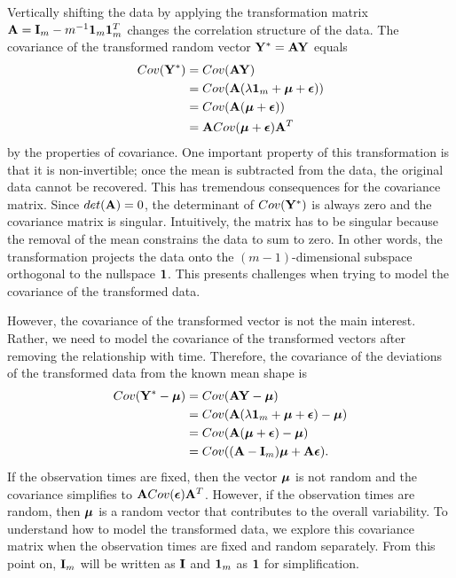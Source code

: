 Vertically shifting the data by applying the transformation matrix $\mathbf A = \mathbf I_{m}-m^{-1}\mathbf 1_{m}\mathbf 1_{m}^{T}$ changes the correlation structure of the data. The covariance of the transformed random vector $\mathbf Y^{*}=\mathbf A\mathbf Y$ equals
\begin{align*}
Cov(\mathbf Y^{*})&=Cov(\mathbf A\mathbf Y)\\
&=Cov( \mathbf A(\lambda\mathbf 1_{m}+ \boldsymbol\mu + \boldsymbol\epsilon))\\
&=Cov( \mathbf A( \boldsymbol\mu + \boldsymbol\epsilon))\\
&= \mathbf ACov( \boldsymbol\mu + \boldsymbol\epsilon)\mathbf A^{T}
\end{align*}
by the properties of covariance. One important property of this transformation is that it is non-invertible; once the mean is subtracted from the data, the original data cannot be recovered. This has tremendous consequences for the covariance matrix. Since $det(\mathbf A) = 0$, the determinant of $Cov(\mathbf Y^{*})$ is always zero and the covariance matrix is singular. Intuitively, the matrix has to be singular because the removal of the mean constrains the data to sum to zero. In other words, the transformation projects the data onto the $(m-1)$-dimensional subspace orthogonal to the nullspace $\mathbf 1$. This presents challenges when trying to model the covariance of the transformed data. 

However, the covariance of the transformed vector is not the main interest. Rather, we need to model the covariance of the transformed vectors after removing the relationship with time. Therefore, the covariance of the deviations of the transformed data from the known mean shape is
\begin{align*}
Cov(\mathbf Y^{*} - \boldsymbol\mu) &= Cov(\mathbf A\mathbf Y - \boldsymbol\mu)\\
&= Cov(\mathbf A(\lambda\mathbf 1_{m} + \boldsymbol\mu + \boldsymbol\epsilon) - \boldsymbol\mu)\\
&= Cov(\mathbf A(\boldsymbol\mu + \boldsymbol\epsilon) - \boldsymbol\mu)\\
&= Cov((\mathbf A-\mathbf I_{m})\boldsymbol\mu + \mathbf A \boldsymbol\epsilon).
\end{align*}
If the observation times are fixed, then the vector $\boldsymbol \mu$ is not random and the covariance simplifies to $\mathbf A Cov(\boldsymbol\epsilon)\mathbf A^{T}$. However, if the observation times are random, then $\boldsymbol \mu$ is a random vector that contributes to the overall variability. To understand how to model the transformed data, we explore this covariance matrix when the observation times are fixed and random separately. From this point on, $\mathbf I_{m}$ will be written as $\mathbf I$ and $\mathbf 1_{m}$ as $\mathbf 1$ for simplification.

